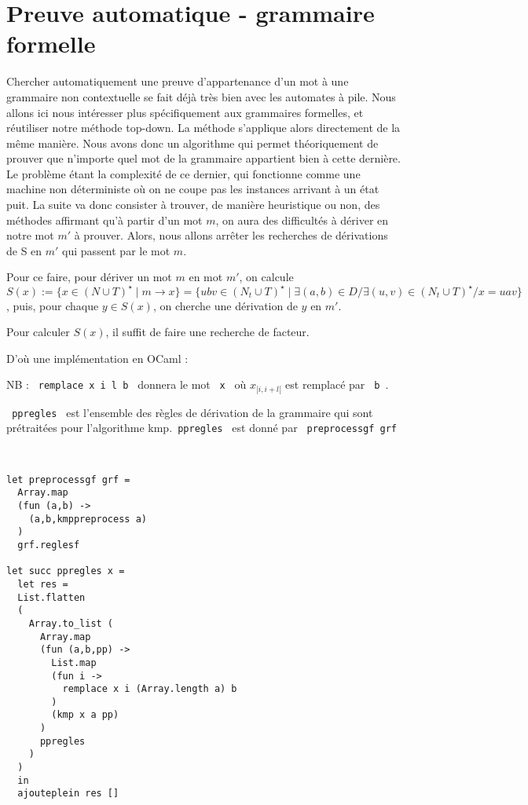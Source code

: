\documentclass[a4paper,12pt]{article}
\begin{document}
\section{Preuve automatique - grammaire formelle}

Chercher automatiquement une preuve d'appartenance d'un mot à une grammaire non contextuelle se fait déjà très bien avec les automates à pile.
Nous allons ici nous intéresser plus spécifiquement aux grammaires formelles, et réutiliser notre méthode top-down.
La méthode s'applique alors directement de la même manière.
Nous avons donc un algorithme qui permet théoriquement de prouver que n'importe quel mot de la grammaire appartient bien à cette dernière.
Le problème étant la complexité de ce dernier, qui fonctionne comme une machine non déterministe où on ne coupe pas les instances arrivant à un état puit.
La suite va donc consister à trouver, de manière heuristique ou non, des méthodes affirmant qu'à partir d'un mot $m$, on aura des difficultés à dériver en notre mot $m'$ à prouver.
Alors, nous allons arrêter les recherches de dérivations de S en $m'$ qui passent par le mot $m$.

Pour ce faire, pour dériver un mot $m$ en mot $m'$, on calcule $S(x) := \{x \in (N\cup T)^\star \mid m \rightarrow x\} 
=\{ubv \in (N_t \cup T)^\star \mid \exists (a,b) \in D / \exists (u,v)\in (N_t \cup T)^\star / x = uav\}$,
puis, pour chaque $ y \in S(x)$, on cherche une dérivation de $y$ en $m'$.

Pour calculer $S(x)$, il suffit de faire une recherche de facteur.

D'où une implémentation en OCaml : 

{\color{gray} NB :  \texttt{ remplace x i l b } donnera le mot \texttt{ x } où $x_{[i,i+l[}$ est remplacé par \texttt{ b }.

\texttt{ ppregles } est l'ensemble des règles de dérivation de la grammaire qui 
sont prétraitées pour l'algorithme kmp.\texttt{ ppregles } est donné par \texttt{ preprocessgf grf }}\\
{\color{DarkBlue}\begin{verbatim}
let preprocessgf grf =
  Array.map 
  (fun (a,b) ->
    (a,b,kmppreprocess a) 
  )
  grf.reglesf 

let succ ppregles x = 
  let res =
  List.flatten
  (
    Array.to_list (
      Array.map
      (fun (a,b,pp) ->
        List.map 
        (fun i ->
          remplace x i (Array.length a) b
        )
        (kmp x a pp)
      )
      ppregles
    )
  )
  in
  ajouteplein res []
\end{verbatim}}
\end{document}
